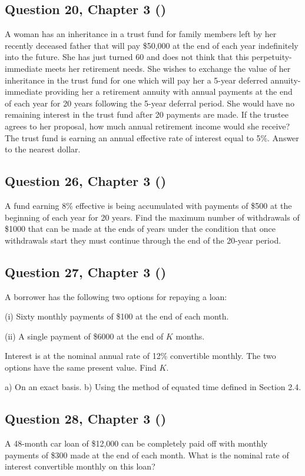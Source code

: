 \documentclass[12pt, a4paper]{article}
\begin{document}
\subsection*{Question 20, Chapter 3  (\cite{toi3rd})}
A woman has an inheritance in a trust fund for family members left by her recently deceased father that will pay \$50,000 at the end of each year indefinitely into the future. 
She has just turned 60 and does not think that this perpetuity-immediate meets her retirement needs. 
She wishes to exchange the value of her inheritance in the trust fund for one which will pay her a 5-year deferred annuity-immediate providing her a retirement annuity with annual payments at the end of each year for 20 years following the 5-year deferral period. 
She would have no remaining interest in the trust fund after 20 payments are made. 
If the trustee agrees to her proposal, how much annual retirement income would she receive? 
The trust fund is earning an annual effective rate of interest equal to 5\%. 
Answer to the nearest dollar.

\subsection*{Question 26, Chapter 3  (\cite{toi3rd})}
A fund earning 8\% effective is being accumulated with payments of \$500 at the beginning of each year for 20 years. 
Find the maximum number of withdrawals of \$1000 that can be made at the ends of years under the condition that once withdrawals start they must continue through the end of the 20-year period.

\subsection*{Question 27, Chapter 3  (\cite{toi3rd})}
A borrower has the following two options for repaying a loan:  

(i) Sixty monthly payments of \$100 at the end of each month.  

(ii) A single payment of \$6000 at the end of $K$ months.  

Interest is at the nominal annual rate of 12\% convertible monthly.  
The two options have the same present value. Find $K$.  

a) On an exact basis.  
b) Using the method of equated time defined in Section 2.4.

\subsection*{Question 28, Chapter 3  (\cite{toi3rd})}
A 48-month car loan of \$12,000 can be completely paid off with monthly payments of \$300 made at the end of each month.  
What is the nominal rate of interest convertible monthly on this loan?  
\end{document}
